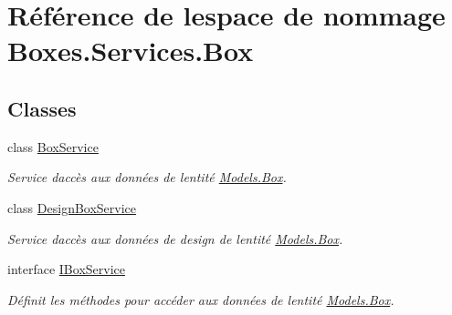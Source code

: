 \hypertarget{namespace_boxes_1_1_services_1_1_box}{}\section{Référence de l\textquotesingle{}espace de nommage Boxes.\+Services.\+Box}
\label{namespace_boxes_1_1_services_1_1_box}
\subsection*{Classes}
\begin{DoxyCompactItemize}
\item 
class \hyperlink{class_boxes_1_1_services_1_1_box_1_1_box_service}{Box\+Service}
\begin{DoxyCompactList}\small\item\em Service d\textquotesingle{}accès aux données de l\textquotesingle{}entité \hyperlink{class_boxes_1_1_models_1_1_box}{Models.\+Box}. \end{DoxyCompactList}\item 
class \hyperlink{class_boxes_1_1_services_1_1_box_1_1_design_box_service}{Design\+Box\+Service}
\begin{DoxyCompactList}\small\item\em Service d\textquotesingle{}accès aux données de design de l\textquotesingle{}entité \hyperlink{class_boxes_1_1_models_1_1_box}{Models.\+Box}. \end{DoxyCompactList}\item 
interface \hyperlink{interface_boxes_1_1_services_1_1_box_1_1_i_box_service}{I\+Box\+Service}
\begin{DoxyCompactList}\small\item\em Définit les méthodes pour accéder aux données de l\textquotesingle{}entité \hyperlink{class_boxes_1_1_models_1_1_box}{Models.\+Box}. \end{DoxyCompactList}\end{DoxyCompactItemize}
